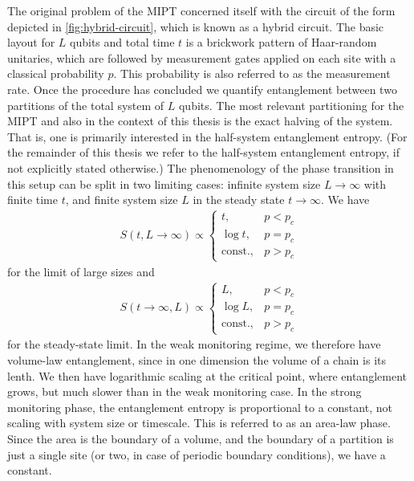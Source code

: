 The original problem of the MIPT concerned itself with the circuit of the form depicted in
\cref{fig:hybrid-circuit}, which is known as a hybrid circuit. The basic
layout for $L$ qubits and total time $t$
is a brickwork pattern of Haar-random unitaries, which are followed by
measurement gates applied on each site with a classical probability
$p$. This probability is also referred to as the measurement rate. 
Once the procedure has concluded we quantify entanglement between two
partitions of the total system of $L$ qubits. The most relevant partitioning
for the MIPT and also in the context of this thesis is the exact halving of the
system. That is, one is primarily interested in the half-system entanglement
entropy. (For the remainder of this thesis we refer to the half-system
entanglement entropy, if not explicitly stated otherwise.) The
phenomenology of the phase transition in this setup can be split in two
limiting cases: infinite system size $L\to \infty$ with finite time $t$, and
finite system size $L$ in the steady state $t \to \infty$. We have
\begin{align}
  S(t, L\to \infty) \propto \begin{cases}
    t, & p<p_c\\
    \log t, & p=p_c\\
    \mathrm{const.}, & p>p_c
  \end{cases}
\end{align}
for the limit of large sizes and
\begin{align}\label{eq:entent-steadystatelimit}
  S(t\to \infty, L) \propto \begin{cases}
    L, & p<p_c\\
    \log L, & p=p_c\\
    \mathrm{const.}, & p>p_c
  \end{cases}
\end{align}
for the steady-state limit.
In the weak monitoring regime, we therefore have volume-law entanglement, since
in one dimension the volume of a chain is its lenth. We then have logarithmic
scaling at the critical point, where entanglement grows, but much slower than
in the weak monitoring case. In the strong monitoring phase, the entanglement
entropy is proportional to a constant, not scaling with system size or
timescale. This is referred to as an area-law phase. Since the area is the
boundary of a volume, and the boundary of a partition is just a single site (or
two, in case of periodic boundary conditions), we have a constant. 

